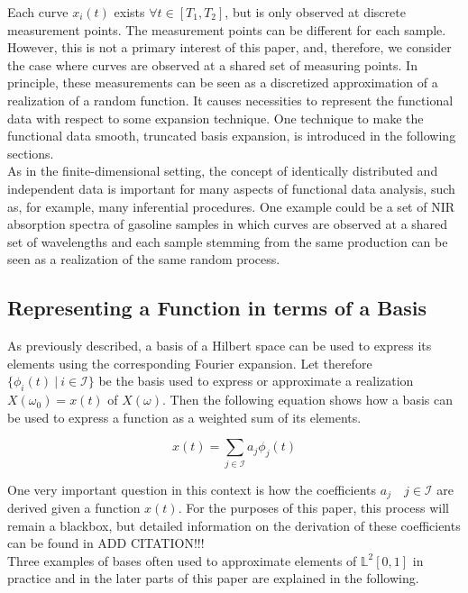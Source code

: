 \documentclass[11pt,twoside,a4paper]{article}
\begin{document}
	Each curve $x_i(t)$ exists $\forall t \in [T_1, T_2]$, but is only observed at discrete measurement points. The measurement points can be different for each sample. However, this is not a primary interest of this paper, and, therefore, we consider the case where curves are observed at a shared set of measuring points. In principle, these measurements can be seen as a discretized approximation of a realization of a random function. It causes necessities to represent the functional data with respect to some expansion technique. One technique to make the functional data smooth, truncated basis expansion, is introduced in the following sections.\\
	As in the finite-dimensional setting, the concept of identically distributed and independent data is important for many aspects of functional data analysis, such as, for example, many inferential procedures. One example could be a set of NIR absorption spectra of gasoline samples in which curves are observed at a shared set of wavelengths and each sample stemming from the same production can be seen as a realization of the same random process.
	
	\subsection{Representing a Function in terms of a Basis} 
	As previously described, a basis of a Hilbert space can be used to express its elements using the corresponding Fourier expansion. Let therefore $\{\phi_i(t) \: \vert \: i \in \mathcal{I}\}$ be the basis used to express or approximate a realization $X(\omega_0) = x(t)$ of $X(\omega)$. Then the following equation shows how a basis can be used to express a function as a weighted sum of its elements.
	
	\begin{equation}
		x(t) = \sum_{j \in \mathcal{I}} a_j \phi_j(t) 
	\end{equation}
	
	One very important question in this context is how the coefficients $a_j \quad j \in \mathcal{I}$ are derived given a function $x(t)$. For the purposes of this paper, this process will remain a blackbox, but detailed information on the derivation of these coefficients can be found in {\color{red} ADD CITATION!!!} \\
	Three examples of bases often used to approximate elements of $\mathbb{L}^2[0,1]$ in practice and in the later parts of this paper are explained in the following.	
	
\end{document}
